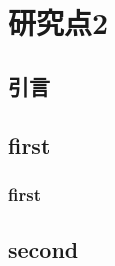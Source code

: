 \chapter{研究点2}\label{chap:chap2}

\section{引言}

\section{first}

\subsection{first}

\section{second}